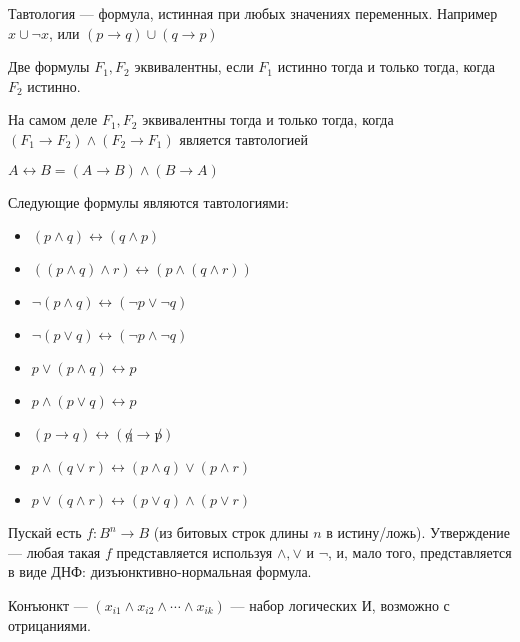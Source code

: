 \begin{definition}
	Тавтология --- формула, истинная при любых значениях переменных. Например $x \cup \lnot x$, или $(p \to q) \cup (q \to p)$
\end{definition}
\begin{definition}
	Две формулы $F_1, F_2$ эквивалентны, если $F_1$ истинно тогда и только тогда, когда $F_2$ истинно.
\end{definition}

На самом деле $F_1, F_2$ эквивалентны тогда и только тогда, когда $(F_1 \to F_2) \land (F_2 \to F_1)$ является тавтологией

\begin{definition}
	$A \leftrightarrow B = (A \to B) \land (B \to A)$ 
\end{definition}

\begin{theorem}
	Следующие формулы являются тавтологиями:
	\begin{itemize}
		\item{$(p \land q) \leftrightarrow (q \land p)$}
		\item{$((p \land q) \land r) \leftrightarrow (p \land (q \land r))$}
		\item{$  \lnot (p \land q) \leftrightarrow (\lnot p \lor \lnot q) $}
		\item{$\lnot (p \lor q) \leftrightarrow (\lnot p \land \lnot q)$}
		\item{$p \lor (p \land q) \leftrightarrow p$}
		\item{$p \land (p \lor q) \leftrightarrow p$}
		\item{$(p \to q) \leftrightarrow (\not q \to \not p)$}
		\item{$p \land (q \lor r) \leftrightarrow (p \land q) \lor (p \land r)$}
		\item{$p \lor (q \land r) \leftrightarrow (p \lor q) \land (p \lor r)$}
	\end{itemize}
\end{theorem}

\begin{theorem}
	Пускай есть $f : B^n \to B$ (из битовых строк длины $n$ в истину/ложь). Утверждение --- любая такая $f$ представляется используя $\land, \lor $ и $\lnot$, и, мало того, представляется в виде ДНФ: дизъюнктивно-нормальная формула.
\end{theorem}

\begin{definition}
	Конъюнкт --- $(x_{i1} \land x_{i2} \land \cdots \land x_{ik})$ --- набор логических И, возможно с отрицаниями.
	\end{definition}

